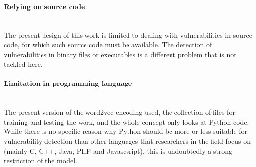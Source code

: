 \documentclass[
	a4paper,
	pagesize,
	pdftex,
	12pt,
	twoside, %
	BCOR=5mm, %
	ngerman,
	fleqn,
	final,
	]{scrartcl}
\begin{document}
\paragraph{Relying on source code}\mbox{}\\
The present design of this work is limited to dealing with vulnerabilities in source code, for which such source code must be available. The detection of vulnerabilities in binary files or executables is a different problem that is not tackled here. 
\paragraph{Limitation in programming language}\mbox{}\\
The present version of the word2vec encoding used, the collection of files for training and testing the work, and the whole concept only looks at Python code. While there is no specific reason why Python should be more or less suitable for vulnerability detection than other languages that researchers in the field focus on (mainly C, C++, Java, PHP and Javascsript), this is undoubtedly a strong restriction of the model.
\end{document}
